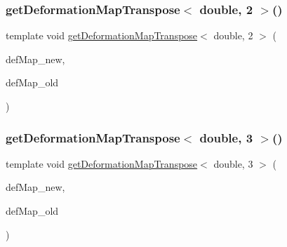 \mbox{\label{function_evaluations_8cc_a06a40fe8ccce6ea8a8005e65e4495a90}} 
\subsubsection{\texorpdfstring{get\+Deformation\+Map\+Transpose$<$ double, 2 $>$()}{getDeformationMapTranspose< double, 2 >()}}
{\footnotesize\ttfamily template void \mbox{\hyperlink{group___evaluation_functions_gad4003712a2346a79e13bdbfcad4d1e1c}{get\+Deformation\+Map\+Transpose}}$<$ double, 2 $>$ (\begin{DoxyParamCaption}\item[{\mbox{\hyperlink{structdeformation_map}{deformation\+Map}}$<$ double, 2 $>$ \&}]{def\+Map\+\_\+new,  }\item[{\mbox{\hyperlink{structdeformation_map}{deformation\+Map}}$<$ double, 2 $>$ \&}]{def\+Map\+\_\+old }\end{DoxyParamCaption})}

\mbox{\label{function_evaluations_8cc_a867f90eaceee3244d8e5fd5692fe0117}} 
\subsubsection{\texorpdfstring{get\+Deformation\+Map\+Transpose$<$ double, 3 $>$()}{getDeformationMapTranspose< double, 3 >()}}
{\footnotesize\ttfamily template void \mbox{\hyperlink{group___evaluation_functions_gad4003712a2346a79e13bdbfcad4d1e1c}{get\+Deformation\+Map\+Transpose}}$<$ double, 3 $>$ (\begin{DoxyParamCaption}\item[{\mbox{\hyperlink{structdeformation_map}{deformation\+Map}}$<$ double, 3 $>$ \&}]{def\+Map\+\_\+new,  }\item[{\mbox{\hyperlink{structdeformation_map}{deformation\+Map}}$<$ double, 3 $>$ \&}]{def\+Map\+\_\+old }\end{DoxyParamCaption})}

